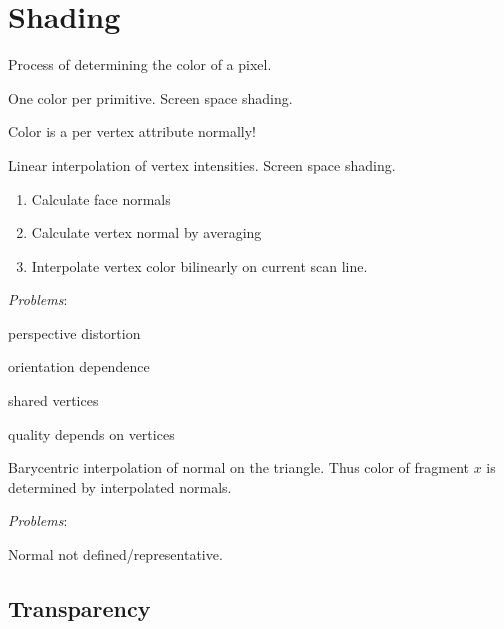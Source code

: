\section{Shading}

\begin{definition}[Shading]
  Process of determining the color of a pixel.
\end{definition}

\begin{definition}
  One color per primitive. Screen space shading.
\end{definition}

\begin{theorem}
  Color is a per vertex attribute normally!
\end{theorem}

\begin{algorithm}
  Linear interpolation of vertex intensities. Screen space shading.
  \begin{enumerate}
    \item Calculate face normals
    \item Calculate vertex normal by averaging
    \item Interpolate vertex color bilinearly on current scan line.
  \end{enumerate}

  \textit{Problems}:
  \begin{itemize*}
    \item perspective distortion
    \item orientation dependence
    \item shared vertices
    \item quality depends on vertices
  \end{itemize*}
\end{algorithm}


\begin{algorithm}
  Barycentric interpolation of normal on the triangle. Thus color of fragment \(x\) is determined by interpolated normals.

  \textit{Problems}:
  \begin{itemize*}
    \item Normal not defined/representative.
  \end{itemize*}
\end{algorithm}

\subsection{Transparency}

